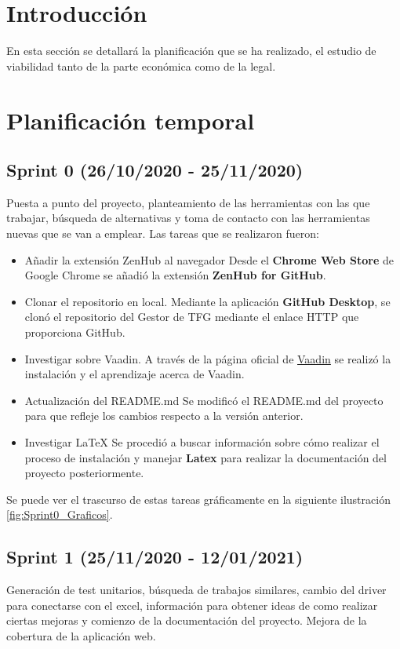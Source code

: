 
\section{Introducción}
En esta sección se detallará la planificación que se ha realizado, el estudio de viabilidad tanto de la parte económica como de la legal.

\section{Planificación temporal}
\subsection{Sprint 0 (26/10/2020 - 25/11/2020)}
Puesta a punto del proyecto, planteamiento de las herramientas con las que trabajar, búsqueda de alternativas y toma de contacto con las herramientas nuevas que se van a emplear.
Las tareas que se realizaron fueron:
\begin{itemize}
	\tightlist
	\item Añadir la extensión ZenHub al navegador
		Desde el \textbf{Chrome Web Store} de Google Chrome se añadió la extensión \textbf{ZenHub for GitHub}.
	\item Clonar el repositorio en local. 
		Mediante la aplicación \textbf{GitHub Desktop}, se clonó el repositorio del Gestor de TFG mediante el enlace HTTP que proporciona GitHub.
	\item Investigar sobre Vaadin.
		A través de la página oficial de \href{https://vaadin.com/}{Vaadin} se realizó la instalación y el aprendizaje acerca de Vaadin.
	\item Actualización del README.md 
		Se modificó el README.md del proyecto para que refleje los cambios respecto a la versión anterior. 
	\item Investigar LaTeX
		Se procedió a buscar información sobre cómo realizar el proceso de instalación y manejar \textbf{Latex} para realizar la documentación del proyecto posteriormente.
\end{itemize}

Se puede ver el trascurso de estas tareas gráficamente en la siguiente ilustración \ref{fig:Sprint0_Graficos}.



\subsection{Sprint 1 (25/11/2020 - 12/01/2021)}
Generación de test unitarios, búsqueda de trabajos similares, cambio del driver para conectarse con el excel, información para obtener ideas de como realizar ciertas mejoras y comienzo de la documentación del proyecto. Mejora de la cobertura de la aplicación web.

